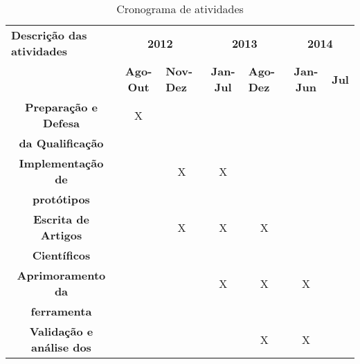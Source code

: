 \begin{table}[htb!]
\caption{Cronograma de atividades} \label{tab:cronograma}  
\begin{tabular}{|l|l|l|l|l|l|l|}
\hline
\textbf{Descrição das atividades} & \multicolumn{2}{c|}{\textbf{2012}} & \multicolumn{2}{c|}{\textbf{2013}} & \multicolumn{2}{c|}{\textbf{2014}} \\ 
\cline{2-7}
 & \multicolumn{1}{c|}{\textbf{Ago-Out}} & \textbf{Nov-Dez} & \multicolumn{1}{c|}{\textbf{Jan-Jul}} & \textbf{Ago-Dez} & \multicolumn{1}{c|}{\textbf{Jan-Jun}} & \textbf{Jul} \\ 
\hline
\multicolumn{1}{|c|}{\textbf{Preparação e Defesa}} & \multicolumn{1}{c|}{X} & \multicolumn{1}{c|}{} & \multicolumn{1}{c|}{} & \multicolumn{1}{c|}{} & \multicolumn{1}{c|}{} & \multicolumn{1}{c|}{} \\ 
\multicolumn{1}{|c|}{\textbf{da Qualificação}} & \multicolumn{1}{c|}{} & \multicolumn{1}{c|}{} & \multicolumn{1}{c|}{} & \multicolumn{1}{c|}{} & \multicolumn{1}{c|}{} & \multicolumn{1}{c|}{} \\ 
\hline
\multicolumn{1}{|c|}{\textbf{Implementação de}} & \multicolumn{1}{c|}{} & \multicolumn{1}{c|}{X} & \multicolumn{1}{c|}{X} & \multicolumn{1}{c|}{} & \multicolumn{1}{c|}{} & \multicolumn{1}{c|}{} \\ 
\multicolumn{1}{|c|}{\textbf{protótipos}} & \multicolumn{1}{c|}{} & \multicolumn{1}{c|}{} & \multicolumn{1}{c|}{} & \multicolumn{1}{c|}{} & \multicolumn{1}{c|}{} & \multicolumn{1}{c|}{} \\ 
\hline
\multicolumn{1}{|c|}{\textbf{Escrita de Artigos}} & \multicolumn{1}{c|}{} & \multicolumn{1}{c|}{X} & \multicolumn{1}{c|}{X} & \multicolumn{1}{c|}{X} & \multicolumn{1}{c|}{} & \multicolumn{1}{c|}{} \\ 
\multicolumn{1}{|c|}{\textbf{Científicos}} & \multicolumn{1}{c|}{} & \multicolumn{1}{c|}{} & \multicolumn{1}{c|}{} & \multicolumn{1}{c|}{} & \multicolumn{1}{c|}{} & \multicolumn{1}{c|}{} \\ 
\hline
\multicolumn{1}{|c|}{\textbf{Aprimoramento da}} & \multicolumn{1}{c|}{} & \multicolumn{1}{c|}{} & \multicolumn{1}{c|}{X} & \multicolumn{1}{c|}{X} & \multicolumn{1}{c|}{X} & \multicolumn{1}{c|}{} \\ 
\multicolumn{1}{|c|}{\textbf{ferramenta}} & \multicolumn{1}{c|}{} & \multicolumn{1}{c|}{} & \multicolumn{1}{c|}{} & \multicolumn{1}{c|}{} & \multicolumn{1}{c|}{} & \multicolumn{1}{c|}{} \\ 
\hline
\multicolumn{1}{|c|}{\textbf{Validação e análise dos}} & \multicolumn{1}{c|}{} & \multicolumn{1}{c|}{} & \multicolumn{1}{c|}{} & \multicolumn{1}{c|}{X} & \multicolumn{1}{c|}{X} & \multicolumn{1}{c|}{} \\ 

\end{tabular}
\end{table}
